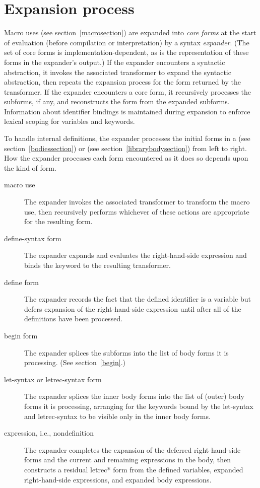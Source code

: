 \chapter{Expansion process}
\label{expansionchapter}

Macro uses (see section~\ref{macrosection}) are expanded into \textit{core
forms} at the start of evaluation (before compilation or interpretation)
by a syntax \emph{expander}.
(The set of core forms is implementation-dependent, as is the
representation of these forms in the expander's output.)
If the expander encounters a syntactic abstraction, it invokes
the associated transformer to expand the syntactic abstraction, then
repeats the expansion process for the form returned by the transformer.
If the expander encounters a core form, it recursively
processes the subforms, if any, and reconstructs the form from the
expanded subforms.
Information about identifier bindings is maintained during expansion
to enforce lexical scoping for variables and keywords.

To handle internal definitions, the expander processes the initial
forms in a  (see section~\ref{bodiessection}) or
 (see section~\ref{librarybodysection})
from left to
right.  How the expander processes each form encountered as it does so
depends upon the kind of form.

\begin{description}
\item[macro use]
The expander invokes the associated transformer to transform the macro
use, then recursively performs whichever of these actions are appropriate
for the resulting form.

\item[{\cf define-syntax} form]
The expander expands and evaluates the right-hand-side expression and binds the
keyword to the resulting transformer.

\item[{\cf define} form]
The expander records the fact that the defined identifier is a variable but defers
expansion of the right-hand-side expression until after all of the
definitions have been processed.

\item[{\cf begin} form]
The expander splices the subforms into the list of body forms it is
processing.  (See section~\ref{begin}.)

\item[{\cf let-syntax} or {\cf letrec-syntax} form]
The expander splices the inner body forms into the list of (outer) body forms it is
processing, arranging for the keywords bound by the {\cf let-syntax}
and {\cf letrec-syntax} to be visible only in the inner body forms.

\item[expression, i.e., nondefinition]
The expander completes the expansion of the deferred right-hand-side forms
and the current and remaining expressions in the body, then
constructs a residual {\cf letrec*} form from the defined variables,
expanded right-hand-side expressions, and expanded body expressions.
\end{description}

